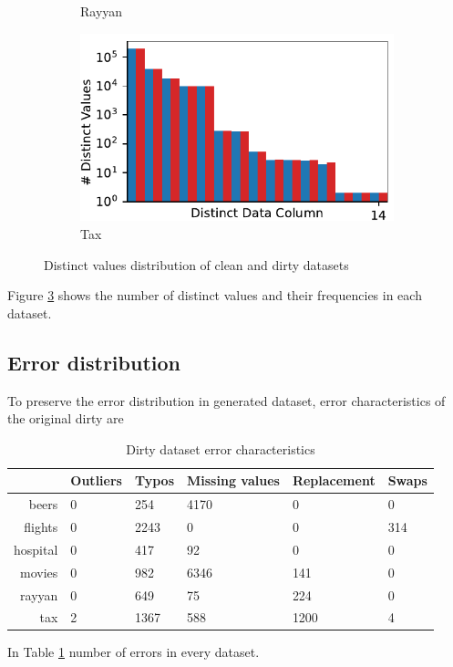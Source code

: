 \begin{figure}[!t]
\begin{subfigure}{0.4\textwidth}
    \caption{Rayyan}
    \label{exp:distincts_rayyan}
\end{subfigure}
\hfill
\begin{subfigure}{0.4\textwidth}
    \includegraphics[width=\textwidth]{figures/plot/distinct/tax_distinct/combined.pdf}
    \caption{Tax}
    \label{exp:distincts_tax}
\end{subfigure}
\hfill
        
\caption{Distinct values distribution of clean and dirty datasets}
\label{exp:distinct_values_datasets}
\end{figure}
Figure \ref{exp:distinct_values_datasets} shows the number of distinct values and their frequencies in each dataset. 

\subsection{Error distribution}
To preserve the error distribution in generated dataset, error characteristics of the original dirty are %
\begin{table}[!t]
\caption{\label{tab:dirty_num_errors}Dirty dataset error characteristics}
\begin{tabular}{r|l|l|l|l|l}
\toprule
                     & Outliers & Typos & Missing values & Replacement & Swaps \\ \midrule
beers                & 0        & 254   & 4170           & 0                & 0       \\
flights              & 0        & 2243  & 0              & 0                & 314     \\
hospital             & 0        & 417   & 92             & 0                & 0       \\
movies               & 0        & 982   & 6346           & 141              & 0       \\
rayyan               & 0        & 649   & 75             & 224              & 0       \\
tax                  & 2        & 1367  & 588            & 1200             & 4       \\ \bottomrule
\end{tabular}
\end{table}
In Table \ref{tab:dirty_num_errors} number of errors in every dataset.

